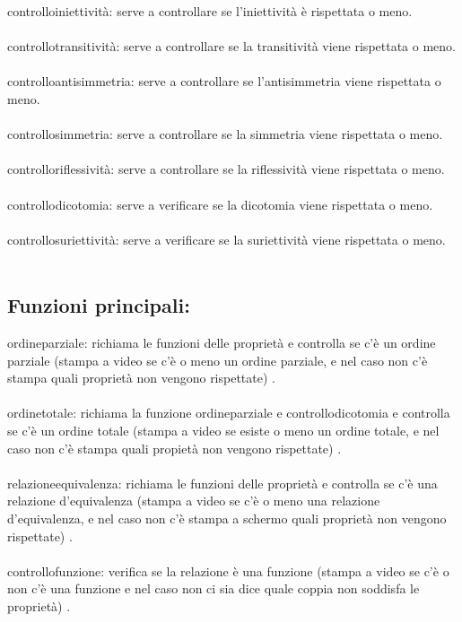 \documentclass[11pt, a4paper, titlepage, block]{article}
\begin{document}
	controllo\textunderscore iniettivit\`a: serve a controllare se l'iniettivit\`a \`e rispettata o meno.\\
	\\
	controllo\textunderscore transitivit\`a: serve a controllare se la transitivit\`a 
	viene rispettata o meno.\\
	\\
	controllo\textunderscore antisimmetria: serve a controllare se l'antisimmetria viene rispettata o meno.\\
	\\
	controllo\textunderscore simmetria: serve a controllare se la simmetria viene rispettata o meno.\\
	\\
	controllo\textunderscore riflessivit\`a: serve a controllare se la riflessivit\`a viene rispettata o meno.\\
	\\
	controllo\textunderscore dicotomia: serve a verificare se la dicotomia viene rispettata o meno.\\
	\\
	controllo\textunderscore suriettivit\`a: serve a verificare se la suriettivit\`a viene rispettata o meno.\\
	\\
	\newpage
	\subsection{Funzioni principali:}
	ordine\textunderscore parziale: richiama le funzioni delle propriet\`a e controlla se c'\`e un ordine parziale (stampa a video se c'\`e o meno un ordine parziale, e nel caso non c'\`e stampa quali propriet\`a non vengono rispettate) .\\
	\\
	ordine\textunderscore totale: richiama la funzione ordine\textunderscore parziale e controllo\textunderscore dicotomia e controlla se c'\`e un ordine totale (stampa a video se esiste o meno un ordine totale, e nel caso non c'\`e stampa quali propiet\`a non vengono rispettate) .\\
	\\
	relazione\textunderscore equivalenza: richiama le funzioni delle propriet\`a e controlla se c'\`e una relazione d'equivalenza (stampa a video se c'\`e o meno una relazione d'equivalenza, e nel caso non c'\`e stampa a schermo quali propriet\`a non vengono rispettate) .\\
	\\
	controllo\textunderscore funzione: verifica se la relazione \`e una funzione (stampa a video se c'\`e o non c'\`e una funzione e nel caso non ci sia dice quale coppia non soddisfa le propriet\`a) .\\
	\\
	\newpage 
\end{document}
